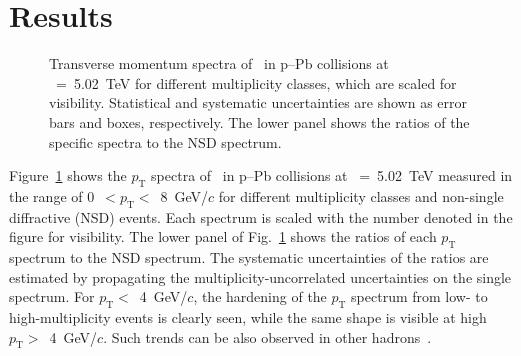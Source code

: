 
\section {Results}
\label{sec:results}

\begin{figure}[!hbt]
	\centering
	\caption{ Transverse momentum spectra of \fzero~in p--Pb collisions at \snn~=~5.02~TeV for different multiplicity classes, which are scaled for visibility. Statistical and systematic uncertainties are shown as error bars and boxes, respectively. The lower panel shows the ratios of the specific spectra to the NSD spectrum. }
	\label{fig:pt}
\end{figure}

Figure~\ref{fig:pt} shows the $p_{\mathrm{T}}$ spectra of \fzero~in p--Pb collisions at \snn~=~5.02~TeV measured in the range of 0~$<p_{\mathrm{T}}<$~8~GeV/$c$ for different multiplicity classes and non-single diffractive (NSD) events. Each spectrum is scaled with the number denoted in the figure for visibility. The lower panel of Fig.~\ref{fig:pt} shows the ratios of each $p_{\mathrm{T}}$ spectrum to the NSD spectrum. The systematic uncertainties of the ratios are estimated by propagating the multiplicity-uncorrelated uncertainties on the single spectrum. For $p_{\mathrm{T}}<$~4~GeV/$c$, the hardening of the $p_{\mathrm{T}}$ spectrum from low- to high-multiplicity events is clearly seen, while the same shape is visible at high $p_{\mathrm{T}}>$~4~GeV/$c$. Such trends can be also observed in other hadrons~\cite{Tsallis:1987eu}.

